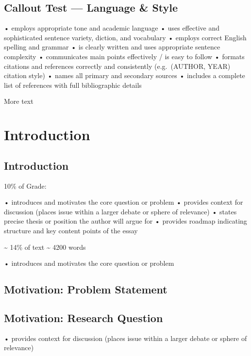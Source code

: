\documentclass[12pt,a4paper]{report}      %
\begin{document}
\section{Callout Test --- Language \&
Style}\label{callout-test-language-style}

• employs appropriate tone and academic language • uses effective and
sophisticated sentence variety, diction, and vocabulary • employs
correct English spelling and grammar • is clearly written and uses
appropriate sentence complexity • communicates main points effectively /
is easy to follow • formats citations and references correctly and
consistently (e.g.~(AUTHOR, YEAR) citation style) • names all primary
and secondary sources • includes a complete list of references with full
bibliographic details

More text

\chapter{Introduction}\label{introduction}

\section{Introduction}\label{introduction-1}

10\% of Grade:

• introduces and motivates the core question or problem • provides
context for discussion (places issue within a larger debate or sphere of
relevance) • states precise thesis or position the author will argue for
• provides roadmap indicating structure and key content points of the
essay

\textasciitilde{} 14\% of text \textasciitilde{} 4200 words

• introduces and motivates the core question or problem

\section{Motivation: Problem
Statement}\label{motivation-problem-statement}

\section{Motivation: Research
Question}\label{motivation-research-question}

• provides context for discussion (places issue within a larger debate
or sphere of relevance)
\end{document}
